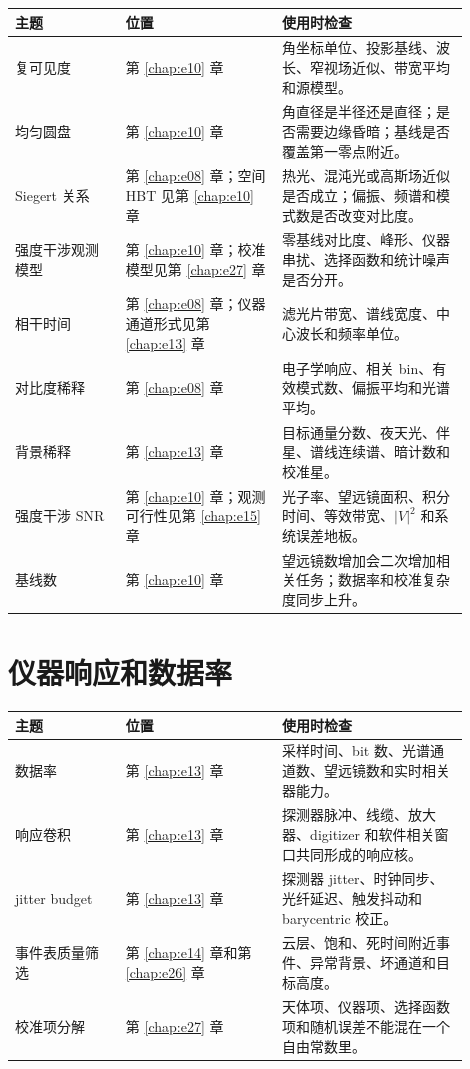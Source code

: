 \begin{longtable}{p{0.22\linewidth}p{0.31\linewidth}p{0.37\linewidth}}
\toprule
主题 & 位置 & 使用时检查 \\
\midrule
复可见度 & 第 \ref{chap:e10} 章 & 角坐标单位、投影基线、波长、窄视场近似、带宽平均和源模型。 \\
均匀圆盘 & 第 \ref{chap:e10} 章 & 角直径是半径还是直径；是否需要边缘昏暗；基线是否覆盖第一零点附近。 \\
Siegert 关系 & 第 \ref{chap:e08} 章；空间 HBT 见第 \ref{chap:e10} 章 & 热光、混沌光或高斯场近似是否成立；偏振、频谱和模式数是否改变对比度。 \\
强度干涉观测模型 & 第 \ref{chap:e10} 章；校准模型见第 \ref{chap:e27} 章 & 零基线对比度、峰形、仪器串扰、选择函数和统计噪声是否分开。 \\
相干时间 & 第 \ref{chap:e08} 章；仪器通道形式见第 \ref{chap:e13} 章 & 滤光片带宽、谱线宽度、中心波长和频率单位。 \\
对比度稀释 & 第 \ref{chap:e08} 章 & 电子学响应、相关 bin、有效模式数、偏振平均和光谱平均。 \\
背景稀释 & 第 \ref{chap:e13} 章 & 目标通量分数、夜天光、伴星、谱线连续谱、暗计数和校准星。 \\
强度干涉 SNR & 第 \ref{chap:e10} 章；观测可行性见第 \ref{chap:e15} 章 & 光子率、望远镜面积、积分时间、等效带宽、\(|V|^2\) 和系统误差地板。 \\
基线数 & 第 \ref{chap:e10} 章 & 望远镜数增加会二次增加相关任务；数据率和校准复杂度同步上升。 \\
\bottomrule
\end{longtable}

\section{仪器响应和数据率}
\label{appsec:a-instrument}

\begin{longtable}{p{0.22\linewidth}p{0.31\linewidth}p{0.37\linewidth}}
\toprule
主题 & 位置 & 使用时检查 \\
\midrule
数据率 & 第 \ref{chap:e13} 章 & 采样时间、bit 数、光谱通道数、望远镜数和实时相关器能力。 \\
响应卷积 & 第 \ref{chap:e13} 章 & 探测器脉冲、线缆、放大器、digitizer 和软件相关窗口共同形成的响应核。 \\
jitter budget & 第 \ref{chap:e13} 章 & 探测器 jitter、时钟同步、光纤延迟、触发抖动和 barycentric 校正。 \\
事件表质量筛选 & 第 \ref{chap:e14} 章和第 \ref{chap:e26} 章 & 云层、饱和、死时间附近事件、异常背景、坏通道和目标高度。 \\
校准项分解 & 第 \ref{chap:e27} 章 & 天体项、仪器项、选择函数项和随机误差不能混在一个自由常数里。 \\
\bottomrule
\end{longtable}

